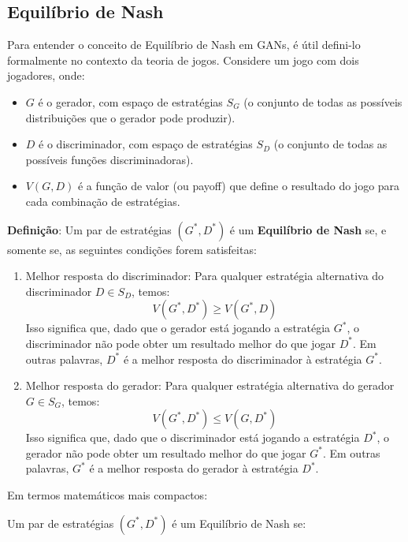 \documentclass{article}
\begin{document}
\subsection{Equilíbrio de Nash}

Para entender o conceito de Equilíbrio de Nash em GANs, é útil defini-lo formalmente no contexto da teoria de jogos. Considere um jogo com dois jogadores, onde:

\begin{itemize}
    \item $G$ é o gerador, com espaço de estratégias $S_G$ (o conjunto de todas as possíveis distribuições que o gerador pode produzir).
    \item $D$ é o discriminador, com espaço de estratégias $S_D$ (o conjunto de todas as possíveis funções discriminadoras).
    \item $V(G, D)$ é a função de valor (ou payoff) que define o resultado do jogo para cada combinação de estratégias.
\end{itemize}

\textbf{Definição}: Um par de estratégias $(G^*, D^*)$ é um \textbf{Equilíbrio de Nash} se, e somente se, as seguintes condições forem satisfeitas:
\begin{enumerate}
    \item Melhor resposta do discriminador: Para qualquer estratégia alternativa do discriminador $D \in S_D$, temos:
    \begin{equation}
    V(G^*, D^*) \geq V(G^*, D)
    \end{equation}
    Isso significa que, dado que o gerador está jogando a estratégia $G^*$, o discriminador não pode obter um resultado melhor do que jogar $D^*$. Em outras palavras, $D^*$ é a melhor resposta do discriminador à estratégia $G^*$.
    \item Melhor resposta do gerador: Para qualquer estratégia alternativa do gerador $G \in S_G$, temos:
    \begin{equation}
    V(G^*, D^*) \leq V(G, D^*)
    \end{equation}
    Isso significa que, dado que o discriminador está jogando a estratégia $D^*$, o gerador não pode obter um resultado melhor do que jogar $G^*$. Em outras palavras, $G^*$ é a melhor resposta do gerador à estratégia $D^*$.
\end{enumerate}
    
Em termos matemáticos mais compactos:

Um par de estratégias $(G^*, D^*)$ é um Equilíbrio de Nash se:
\end{document}
